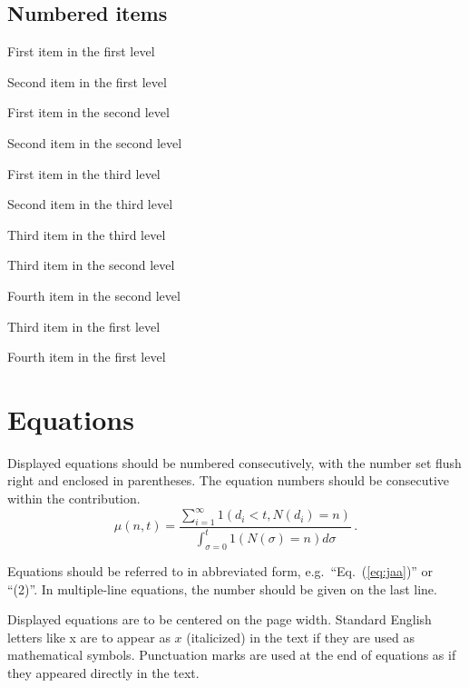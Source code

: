 \documentclass{ws-ijseke}
\begin{document}
\subsection*{Numbered items}

\begin{arabiclist}
\item First item in the first level
\item Second item in the first level
\begin{alphlist}[(a)]
\item First item in the second level 
\item Second item in the second level
\begin{romanlist}[iii.]
\item First item in the third level 
\item Second item in the third level
\item Third item in the third level
\end{romanlist}
\item Third item in the second level
\item Fourth item in the second level
\end{alphlist}
\item Third item in the first level
\item Fourth item in the first level
\end{arabiclist}

\section{Equations}

Displayed equations should be numbered consecutively,
with the number set flush right and enclosed in parentheses. The
equation numbers should be consecutive within the contribution.
\begin{equation}
\mu(n, t) = \frac{\sum^\infty_{i=1} 1(d_i < t, N(d_i) = n)}{
\int^t_{\sigma=0} 1(N(\sigma) = n)d\sigma}\, .
\label{eq:jaa}
\end{equation}

Equations should be referred to in abbreviated form,
e.g.~``Eq.~(\ref{eq:jaa})'' or ``(2)''. In multiple-line
equations, the number should be given on the last line.

Displayed equations are to be centered on the page width.
Standard English letters like x are to appear as $x$
(italicized) in the text if they are used as mathematical
symbols. Punctuation marks are used at the end of equations as
if they appeared directly in the text.
\end{document}
